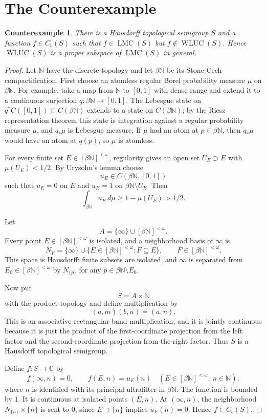 \documentclass[11pt]{article}
\newtheorem*{theorem}{Counterexample}
\newcommand{\C}{\mathbb C}
\newcommand{\N}{\mathbb N}
\newcommand{\WLUC}{\operatorname{WLUC}}
\newcommand{\LMC}{\operatorname{LMC}}
\newcommand{\Cb}{C_b}
\newcommand{\betaN}{\beta\N}
\newcommand{\Fin}{[\beta\N]^{<\omega}}
\begin{document}
\section*{The Counterexample}

\begin{theorem}
There is a Hausdorff topological semigroup \(S\) and a function
\(f\in\Cb(S)\) such that \(f\in \LMC(S)\) but \(f\notin \WLUC(S)\). Hence
\(\WLUC(S)\) is a proper subspace of \(\LMC(S)\) in general.
\end{theorem}

\begin{proof}
Let \(\N\) have the discrete topology and let \(\betaN\) be its Stone-Cech
compactification. First choose an atomless regular Borel probability measure
\(\mu\) on \(\betaN\). For example, take a map from \(\N\) to \([0,1]\) with
dense range and extend it to a continuous surjection \(q:\betaN\to[0,1]\).
The Lebesgue state on \(q^\ast C([0,1])\subset C(\betaN)\) extends to a state
on \(C(\betaN)\); by the Riesz representation theorem this state is integration
against a regular probability measure \(\mu\), and \(q_\ast\mu\) is Lebesgue
measure. If \(\mu\) had an atom at \(p\in\betaN\), then \(q_\ast\mu\) would
have an atom at \(q(p)\), so \(\mu\) is atomless.

For every finite set \(E\in\Fin\), regularity gives an open set
\(U_E\supset E\) with \(\mu(U_E)<1/2\). By Urysohn's lemma choose
\[
  u_E\in C(\betaN,[0,1])
\]
such that \(u_E=0\) on \(E\) and \(u_E=1\) on \(\betaN\setminus U_E\). Then
\[
  \int_{\betaN} u_E\,d\mu \geq 1-\mu(U_E)>1/2. \tag{1}
\]

Let
\[
  A=\{\infty\}\cup \Fin .
\]
Every point \(E\in\Fin\) is isolated, and a neighborhood basis of \(\infty\)
is
\[
  N_F=\{\infty\}\cup\{E\in\Fin: F\subseteq E\},\qquad F\in\Fin.
\]
This space is Hausdorff: finite subsets are isolated, and \(\infty\) is
separated from \(E_0\in\Fin\) by \(N_{\{p\}}\) for any \(p\in\betaN\setminus
E_0\).

Now put
\[
  S=A\times \N
\]
with the product topology and define multiplication by
\[
  (a,m)(b,n)=(a,n).
\]
This is an associative rectangular-band multiplication, and it is jointly
continuous because it is just the product of the first-coordinate projection
from the left factor and the second-coordinate projection from the right
factor. Thus \(S\) is a Hausdorff topological semigroup.

Define \(f:S\to\C\) by
\[
  f(\infty,n)=0,\qquad f(E,n)=u_E(n)\quad(E\in\Fin,\ n\in\N),
\]
where \(n\) is identified with its principal ultrafilter in \(\betaN\). The
function is bounded by \(1\). It is continuous at isolated points
\((E,n)\). At \((\infty,n)\), the neighborhood \(N_{\{n\}}\times\{n\}\) is
sent to \(0\), since \(E\supset\{n\}\) implies \(u_E(n)=0\). Hence
\(f\in\Cb(S)\).


\end{proof}
\end{document}
